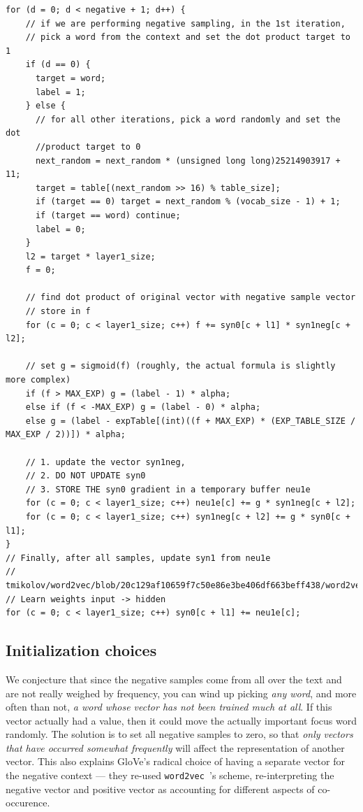 \documentclass[11pt]{book}
\newcommand{\wtov}{\texttt{word2vec }}
\begin{document}
\begin{verbatim}
for (d = 0; d < negative + 1; d++) {
	// if we are performing negative sampling, in the 1st iteration,
	// pick a word from the context and set the dot product target to 1
	if (d == 0) {
	  target = word;
	  label = 1;
	} else {
	  // for all other iterations, pick a word randomly and set the dot
	  //product target to 0
	  next_random = next_random * (unsigned long long)25214903917 + 11;
	  target = table[(next_random >> 16) % table_size];
	  if (target == 0) target = next_random % (vocab_size - 1) + 1;
	  if (target == word) continue;
	  label = 0;
	}
	l2 = target * layer1_size;
	f = 0;
	
	// find dot product of original vector with negative sample vector
	// store in f
	for (c = 0; c < layer1_size; c++) f += syn0[c + l1] * syn1neg[c + l2];
	
	// set g = sigmoid(f) (roughly, the actual formula is slightly more complex)
	if (f > MAX_EXP) g = (label - 1) * alpha;
	else if (f < -MAX_EXP) g = (label - 0) * alpha;
	else g = (label - expTable[(int)((f + MAX_EXP) * (EXP_TABLE_SIZE / MAX_EXP / 2))]) * alpha;
	
	// 1. update the vector syn1neg,
	// 2. DO NOT UPDATE syn0
	// 3. STORE THE syn0 gradient in a temporary buffer neu1e
	for (c = 0; c < layer1_size; c++) neu1e[c] += g * syn1neg[c + l2];
	for (c = 0; c < layer1_size; c++) syn1neg[c + l2] += g * syn0[c + l1];
}
// Finally, after all samples, update syn1 from neu1e
// tmikolov/word2vec/blob/20c129af10659f7c50e86e3be406df663beff438/word2vec.c#L541
// Learn weights input -> hidden
for (c = 0; c < layer1_size; c++) syn0[c + l1] += neu1e[c];
\end{verbatim}

\subsection{Initialization choices}

We conjecture that since the negative samples come from all over the text
and are not really weighed by frequency, you can wind up picking \emph{any word},
and more often than not, \emph{a word whose vector has not been trained much at all}.
If this vector actually had a value, then it could move the actually important
focus word randomly. The solution is to set all negative samples to zero, so that 
\emph{only vectors that have occurred somewhat frequently} will affect the representation 
of another vector. This also explains GloVe's radical choice of having a separate vector
for the negative context --- they re-used \wtov's  scheme, re-interpreting
the negative vector and positive vector as accounting for different aspects of co-occurence.
\end{document}
